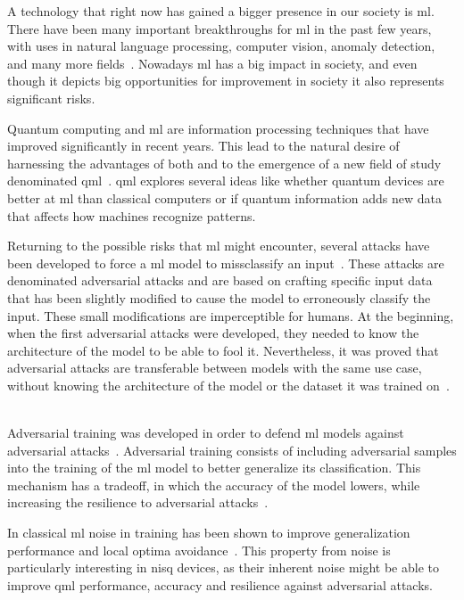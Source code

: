 A technology that right now has gained a bigger presence in our society is \ac{ml}.
There have been many important breakthroughs for \ac{ml} in the past few years, with
uses in natural language processing, computer vision, anomaly detection, and many
more fields~\cite{bommasani_opportunities_2022}. Nowadays \ac{ml} has a big impact
in society, and even though it depicts big opportunities for improvement in
society it also represents significant risks. \

Quantum computing and \ac{ml} are information processing techniques that have
improved significantly in recent years. This lead to the natural desire of
harnessing the advantages of both and to the emergence of a new field of study
denominated \ac{qml}~\cite{schuld_machine_2021}. \ac{qml} explores several ideas
like whether quantum devices are better at \ac{ml} than classical computers or
if quantum information adds new data that affects how machines recognize patterns. \

Returning to the possible risks that \ac{ml} might encounter, several attacks have
been developed to force a \ac{ml} model to missclassify an input~\cite{szegedy_intriguing_2014}.
These attacks are denominated adversarial attacks and are based on crafting specific
input data that has been slightly modified to cause the model to erroneously classify
the input. These small modifications are imperceptible for humans. At the beginning,
when the first adversarial attacks were developed, they needed to know the
architecture of the model to be able to fool it. Nevertheless, it was proved
that adversarial attacks are transferable between models with the same use
case, without knowing the architecture of the model or the dataset it was
trained on~\cite{papernot_transferability_2016}. \

Adversarial training was developed in order to defend \ac{ml} models against
adversarial attacks~\cite{goodfellow_explaining_2015, szegedy_intriguing_2014}.
Adversarial training consists of including adversarial samples into the training
of the \ac{ml} model to better generalize its classification. This mechanism
has a tradeoff, in which the accuracy of the model lowers, while increasing the
resilience to adversarial attacks~\cite{kurakin_adversarial_2017}. \

In classical \ac{ml} noise in training has been shown to improve generalization
performance and local optima avoidance~\cite{ciliberto_quantum_2018}. This
property from noise is particularly interesting in \ac{nisq} devices, as their
inherent noise might be able to improve \ac{qml} performance, accuracy and
resilience against adversarial attacks. \

